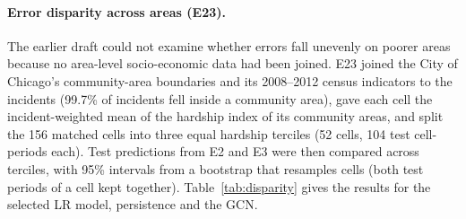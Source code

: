 \documentclass[11pt,a4paper]{report}
\begin{document}
\paragraph{Error disparity across areas (E23).} The earlier draft could not examine whether errors fall unevenly on poorer areas because no area-level socio-economic data had been joined. E23 joined the City of Chicago's community-area boundaries \citep{chicago2026ca} and its 2008--2012 census indicators \citep{chicago2026census} to the incidents (99.7\% of incidents fell inside a community area), gave each cell the incident-weighted mean of the hardship index of its community areas, and split the 156 matched cells into three equal hardship terciles (52 cells, 104 test cell-periods each). Test predictions from E2 and E3 were then compared across terciles, with 95\% intervals from a bootstrap that resamples cells (both test periods of a cell kept together). Table~\ref{tab:disparity} gives the results for the selected LR model, persistence and the GCN.

\begin{table}[H]
\centering\scriptsize
\caption{Test errors by community-area hardship tercile (E23; 104 test cell-periods per tercile; 95\% cell-bootstrap intervals in brackets)}
\label{tab:disparity}
\end{table}
\end{document}
